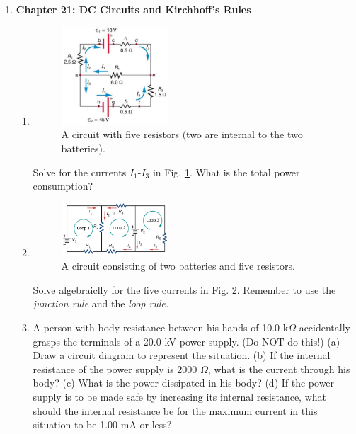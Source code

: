 \documentclass[10pt]{article}
\begin{document}
\maketitle

\begin{enumerate}
\item \textbf{Chapter 21: DC Circuits and Kirchhoff's Rules}
\begin{enumerate}
\item 
\begin{figure}[ht]
\centering
\includegraphics[width=0.4\textwidth]{circuit1.png}
\caption{\label{fig:circuit1} A circuit with five resistors (two are internal to the two batteries).}
\end{figure}
Solve for the currents $I_1$-$I_3$ in Fig. \ref{fig:circuit1}.  What is the total power consumption? \\ \vspace{4cm}
\item 
\begin{figure}[ht]
\centering
\includegraphics[width=0.4\textwidth]{circuit2.png}
\caption{\label{fig:circuit2} A circuit consisting of two batteries and five resistors.}
\end{figure}
Solve algebraiclly for the five currents in Fig. \ref{fig:circuit2}.  Remember to use the \textit{junction rule} and the \textit{loop rule.} \\ \vspace{4cm}
\item A person with body resistance between his hands of 10.0 k$\Omega$ accidentally grasps the terminals of a 20.0 kV power supply. (Do NOT do this!) (a) Draw a circuit diagram to represent the situation. (b) If the internal resistance of the power supply is 2000 $\Omega$, what is the current through his body? (c) What is the power dissipated in his body? (d) If the power supply is to be made safe by increasing its internal resistance, what should the internal resistance be for the maximum current in this situation to be 1.00 mA or less? \\ \vspace{3cm}

\end{enumerate}
\end{enumerate}
\end{document}
